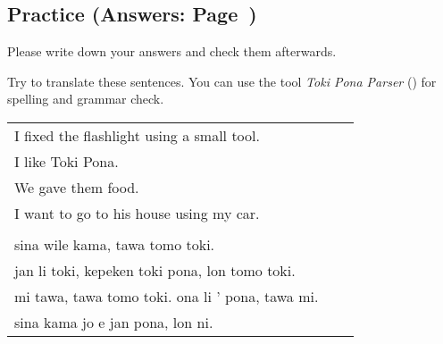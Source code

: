 \subsection*{Practice (Answers: Page~\pageref{'prepositional_objects'})}
%
Please write down your answers and check them afterwards. 

Try to translate these sentences. 
You can use the tool \textit{Toki Pona Parser} (\cite{www:rowa:02}) for spelling and grammar check. 

\begin{supertabular}{p{5,5cm}|ll}
I fixed the flashlight using a small tool.  &&  \\  %
I like Toki Pona.  &&  \\  %
We gave them food.  &&  \\ %
I want to go to his house using my car.  &&  \\  %
&& \\ %
sina wile kama, tawa tomo toki.  &&  \\ %
jan li toki, kepeken toki pona, lon tomo toki.  &&  \\ %
mi tawa, tawa tomo toki. ona li ' pona, tawa mi.  &&  \\ %
sina kama jo e jan pona, lon ni.  &&  \\ %
\end{supertabular} 

%
